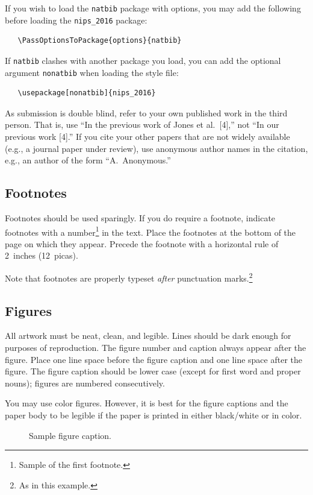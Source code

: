 \documentclass{article}
\begin{document}
If you wish to load the \verb+natbib+ package with options, you may
add the following before loading the \verb+nips_2016+ package:
\begin{verbatim}
   \PassOptionsToPackage{options}{natbib}
\end{verbatim}

If \verb+natbib+ clashes with another package you load, you can add
the optional argument \verb+nonatbib+ when loading the style file:
\begin{verbatim}
   \usepackage[nonatbib]{nips_2016}
\end{verbatim}

As submission is double blind, refer to your own published work in the
third person. That is, use ``In the previous work of Jones et
al.\ [4],'' not ``In our previous work [4].'' If you cite your other
papers that are not widely available (e.g., a journal paper under
review), use anonymous author names in the citation, e.g., an author
of the form ``A.\ Anonymous.''

\subsection{Footnotes}

Footnotes should be used sparingly.  If you do require a footnote,
indicate footnotes with a number\footnote{Sample of the first
  footnote.} in the text. Place the footnotes at the bottom of the
page on which they appear.  Precede the footnote with a horizontal
rule of 2~inches (12~picas).

Note that footnotes are properly typeset \emph{after} punctuation
marks.\footnote{As in this example.}

\subsection{Figures}

All artwork must be neat, clean, and legible. Lines should be dark
enough for purposes of reproduction. The figure number and caption
always appear after the figure. Place one line space before the figure
caption and one line space after the figure. The figure caption should
be lower case (except for first word and proper nouns); figures are
numbered consecutively.

You may use color figures.  However, it is best for the figure
captions and the paper body to be legible if the paper is printed in
either black/white or in color.
\begin{figure}[ht]
  \centering
  \fbox{\rule[-.5cm]{0cm}{4cm} \rule[-.5cm]{4cm}{0cm}}
  \caption{Sample figure caption.}
\end{figure}
\end{document}

